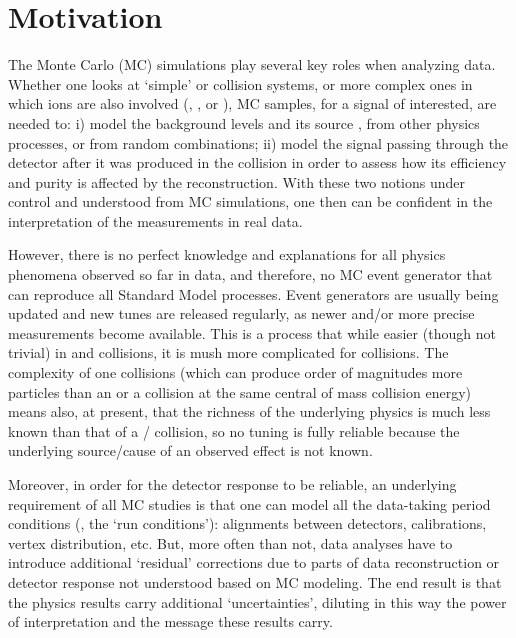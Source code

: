 \section{Motivation}
The Monte Carlo (MC) simulations play several key roles when analyzing data. Whether one looks at `simple'  \eecol or {\pp} collision systems, or more complex ones in which ions are also involved (\eA, \pA, or \aacol ), MC samples, for a signal of interested, are needed to: i) model the background levels and its source \ie, from other physics processes, or from random combinations; ii) model the signal passing through the detector after it was produced in the collision in order to assess how its efficiency and purity is affected by the reconstruction. With these two notions under control and understood from MC simulations, one then can be confident in the interpretation of the measurements in real data. 

However, there is no perfect knowledge and explanations for all physics phenomena observed so far in data, and therefore, no MC event generator that can reproduce all Standard Model processes. Event generators are usually being updated and new tunes are released regularly, as newer and/or more precise measurements become available. This is a process that while easier (though not trivial) in {\eecol} and {\pp} collisions, it is mush more complicated for {\aacol} collisions. The complexity of one {\aacol} collisions (which can produce order of magnitudes more particles than an \eecol or a {\pp} collision at the same central of mass collision energy) means also, at present, that the richness of the underlying physics is much less known than that of a \eecol/{\pp} collision, so no tuning is fully reliable because the underlying source/cause of an observed effect is not known. 

Moreover, in order for the detector response to be reliable, an underlying requirement of all MC studies is that one can model all the data-taking period conditions (\ie, the `run conditions'): alignments between detectors, calibrations, vertex distribution, etc. But, more often than not, data analyses have to introduce additional `residual' corrections due to parts of data reconstruction or detector response not understood based on MC modeling. The end result is that the physics results carry additional `uncertainties', diluting in this way the power of interpretation and the message these results carry. 


